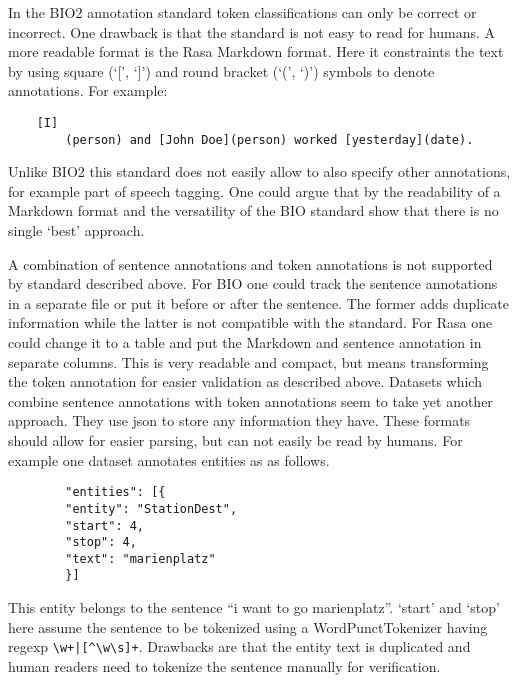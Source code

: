 In the BIO2 annotation standard token classifications can only be correct or incorrect.
One drawback is that the standard is not easy to read for humans.
A more readable format is the Rasa Markdown format.
Here it constraints the text by using square (`[', `]') and round bracket (`(', `)') symbols to denote annotations.
For example:
\begin{center}
    \begin{verbatim}
    [I]
        (person) and [John Doe](person) worked [yesterday](date).
    \end{verbatim}
\end{center}
Unlike BIO2 this standard does not easily allow to also specify other annotations, for example part of speech tagging.
One could argue that by the readability of a Markdown format and the versatility of the BIO standard show that there is no single `best' approach.

A combination of sentence annotations and token annotations is not supported by standard described above.
For BIO one could track the sentence annotations in a separate file or put it before or after the sentence.
The former adds duplicate information while the latter is not compatible with the standard.
For Rasa one could change it to a table and put the Markdown and sentence annotation in separate columns.
This is very readable and compact, but means transforming the token annotation for easier validation as described above.
Datasets which combine sentence annotations with token annotations seem to take yet another approach.
They use json to store any information they have.
These formats should allow for easier parsing, but can not easily be read by humans.
For example one dataset annotates entities as as follows.
\begin{center}
    \begin{verbatim}
        "entities": [{
        "entity": "StationDest",
        "start": 4,
        "stop": 4,
        "text": "marienplatz"
        }]
    \end{verbatim}
\end{center}
This entity belongs to the sentence ``i want to go marienplatz''.
`start' and `stop' here assume the sentence to be tokenized using a WordPunctTokenizer having regexp \verb/\w+|[^\w\s]+/.
Drawbacks are that the entity text is duplicated and human readers need to tokenize the sentence manually for verification.

